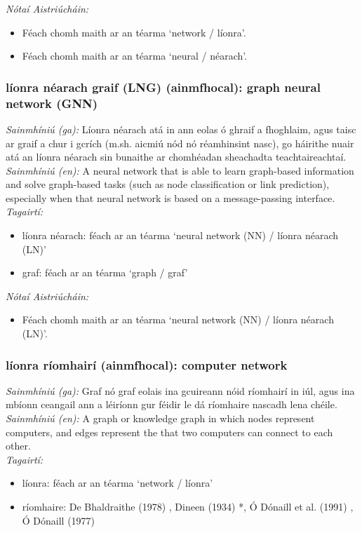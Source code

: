  \noindent \textit{Nótaí Aistriúcháin:}
\begin{itemize}
	\item Féach chomh maith ar an téarma `network / líonra'.
	\item Féach chomh maith ar an téarma `neural / néarach'.
\end{itemize}


\subsubsection*{líonra néarach graif (LNG) (ainmfhocal): graph neural network (GNN)}
 \noindent \textit{Sainmhíniú (ga):} Líonra néarach atá in ann eolas ó ghraif a fhoghlaim, agus taisc ar graif a chur i gcrích (m.sh. aicmiú nód nó réamhinsint nasc), go háirithe nuair atá an líonra néarach sin bunaithe ar chomhéadan sheachadta teachtaireachtaí.
\\
 \noindent \textit{Sainmhíniú (en):} A neural network that is able to learn graph-based information and solve graph-based tasks (such as node classification or link prediction), especially when that neural network is based on a message-passing interface.
\\
 \noindent \textit{Tagairtí:}
\begin{itemize}
	\item líonra néarach: féach ar an téarma `neural network (NN) / líonra néarach (LN)'
	\item graf: féach ar an téarma `graph / graf'
\end{itemize}

 \noindent \textit{Nótaí Aistriúcháin:}
\begin{itemize}
	\item Féach chomh maith ar an téarma `neural network (NN) / líonra néarach (LN)'.
\end{itemize}


\subsubsection*{líonra ríomhairí (ainmfhocal): computer network}
 \noindent \textit{Sainmhíniú (ga):} Graf nó graf eolais ina gcuireann nóid ríomhairí in iúl, agus ina mbíonn ceangail ann a léiríonn gur féidir le dá ríomhaire nascadh lena chéile.
\\
 \noindent \textit{Sainmhíniú (en):} A graph or knowledge graph in which nodes represent computers, and edges represent the that two computers can connect to each other.
\\
 \noindent \textit{Tagairtí:}
\begin{itemize}
	\item líonra: féach ar an téarma `network / líonra'
	\item ríomhaire: De Bhaldraithe (1978) \cite{de-bhaldraithe}, Dineen (1934) \cite{dineen}*, Ó Dónaill et al. (1991) \cite{focloir-beag}, Ó Dónaill (1977) \cite{odonaill}
\end{itemize}

